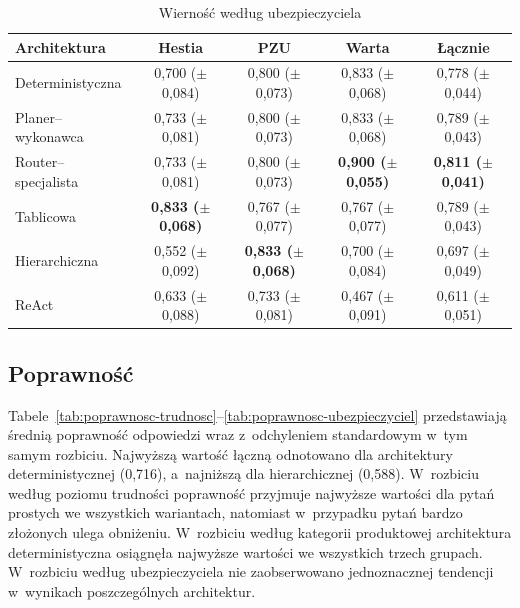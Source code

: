   \begin{table}[H]
    \caption{Wierność według ubezpieczyciela}\label{tab:wiernosc-ubezpieczyciel}
    \centering
    \small
    \renewcommand{\arraystretch}{1.3}
    \begin{tabular}{@{} l c c c c @{}}
      \toprule
      \textbf{Architektura}
      & \textbf{Hestia}
      & \textbf{PZU}
      & \textbf{Warta}
      & \textbf{Łącznie}                                                                                                                              \\
      \midrule
      Deterministyczna    & 0{,}700 (\(\pm\) 0{,}084)          & 0{,}800 (\(\pm\) 0{,}073)          & 0{,}833 (\(\pm\) 0{,}068)          & 0{,}778 (\(\pm\) 0{,}044)          \\
      Planer--wykonawca   & 0{,}733 (\(\pm\) 0{,}081)          & 0{,}800 (\(\pm\) 0{,}073)          & 0{,}833 (\(\pm\) 0{,}068)          & 0{,}789 (\(\pm\) 0{,}043)          \\
      Router--specjalista & 0{,}733 (\(\pm\) 0{,}081)          & 0{,}800 (\(\pm\) 0{,}073)          & \textbf{0{,}900 (\(\pm\) 0{,}055)} & \textbf{0{,}811 (\(\pm\) 0{,}041)} \\
      Tablicowa           & \textbf{0{,}833 (\(\pm\) 0{,}068)} & 0{,}767 (\(\pm\) 0{,}077)          & 0{,}767 (\(\pm\) 0{,}077)          & 0{,}789 (\(\pm\) 0{,}043)          \\
      Hierarchiczna       & 0{,}552 (\(\pm\) 0{,}092)          & \textbf{0{,}833 (\(\pm\) 0{,}068)} & 0{,}700 (\(\pm\) 0{,}084)          & 0{,}697 (\(\pm\) 0{,}049)          \\
      ReAct               & 0{,}633 (\(\pm\) 0{,}088)          & 0{,}733 (\(\pm\) 0{,}081)          & 0{,}467 (\(\pm\) 0{,}091)          & 0{,}611 (\(\pm\) 0{,}051)          \\
      \bottomrule
    \end{tabular}
  \end{table}

  \subsection{Poprawność}\label{subsec:wyniki-poprawnosc}

  Tabele~\ref{tab:poprawnosc-trudnosc}--\ref{tab:poprawnosc-ubezpieczyciel}
  przedstawiają średnią poprawność odpowiedzi wraz z~odchyleniem standardowym
  w~tym samym rozbiciu. Najwyższą wartość łączną odnotowano dla architektury
  deterministycznej (0{,}716), a~najniższą dla hierarchicznej (0{,}588).
  W~rozbiciu według poziomu trudności poprawność przyjmuje najwyższe wartości dla
  pytań prostych we wszystkich wariantach, natomiast w~przypadku pytań bardzo
  złożonych ulega obniżeniu. W~rozbiciu według kategorii produktowej architektura
  deterministyczna osiągnęła najwyższe wartości we wszystkich trzech grupach.
  W~rozbiciu według ubezpieczyciela nie zaobserwowano jednoznacznej tendencji
  w~wynikach poszczególnych architektur.

